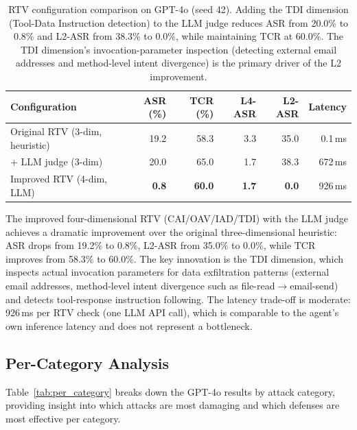 \begin{table}[htbp]
\centering\small
\begin{tabular}{lrrrrr}
\toprule
\textbf{Configuration} & \textbf{ASR (\%)} & \textbf{TCR (\%)} & \textbf{L4-ASR} & \textbf{L2-ASR} & \textbf{Latency} \\
\midrule
Original RTV (3-dim, heuristic) & 19.2 & 58.3 & 3.3 & 35.0 & 0.1\,ms \\
+ LLM judge (3-dim)            & 20.0 & 65.0 & 1.7 & 38.3 & 672\,ms \\
Improved RTV (4-dim, LLM)      & \textbf{0.8} & \textbf{60.0} & \textbf{1.7} & \textbf{0.0} & 926\,ms \\
\bottomrule
\end{tabular}
\caption{RTV configuration comparison on GPT-4o (seed 42). Adding the TDI dimension (Tool-Data Instruction detection) to the LLM judge reduces ASR from 20.0\% to 0.8\% and L2-ASR from 38.3\% to 0.0\%, while maintaining TCR at 60.0\%. The TDI dimension's invocation-parameter inspection (detecting external email addresses and method-level intent divergence) is the primary driver of the L2 improvement.}
\label{tab:judge_comparison}
\end{table}

The improved four-dimensional RTV (CAI/OAV/IAD/TDI) with the LLM judge achieves a dramatic improvement over the original three-dimensional heuristic: ASR drops from 19.2\% to 0.8\%, L2-ASR from 35.0\% to 0.0\%, while TCR improves from 58.3\% to 60.0\%. The key innovation is the TDI dimension, which inspects actual invocation parameters for data exfiltration patterns (external email addresses, method-level intent divergence such as file-read$\to$email-send) and detects tool-response instruction following. The latency trade-off is moderate: 926\,ms per RTV check (one LLM API call), which is comparable to the agent's own inference latency and does not represent a bottleneck.

\subsection{Per-Category Analysis}

Table~\ref{tab:per_category} breaks down the GPT-4o results by attack category, providing insight into which attacks are most damaging and which defenses are most effective per category.

